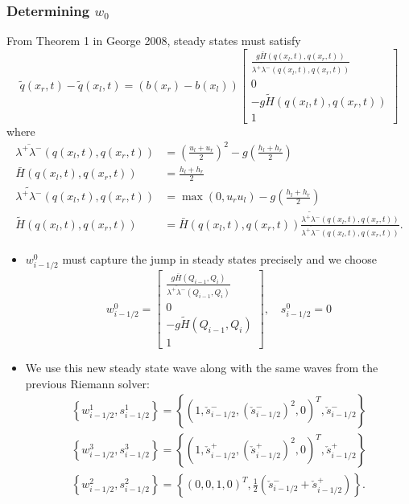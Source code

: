 \documentclass{beamer}
\begin{document}
\frame
{
\frametitle{Determining $w_0$}
From Theorem 1 in George 2008, steady states must satisfy
\begin{equation}
\tilde{q}(x_r,t)-\tilde{q}(x_l,t)=(b(x_r)-b(x_l))\begin{bmatrix}
\frac{g\bar{H}(q(x_l,t),q(x_r,t))}{\overline{\lambda^+ \lambda^-}(q(x_l,t),q(x_r,t))}\\
0\\
-g\tilde{H}(q(x_l,t),q(x_r,t))\\
1
\end{bmatrix}
\end{equation}
where
\begin{align*}
\overline{\lambda^+ \lambda^-}(q(x_l,t),q(x_r,t))&=\left(\frac{u_l+u_r}{2}\right)^2-g\left(\frac{h_l+h_r}{2}\right)  \\
\bar{H}(q(x_l,t),q(x_r,t))&=\frac{h_l+h_r}{2}\\
\widetilde{\lambda^+ \lambda^-}(q(x_l,t),q(x_r,t))&= \max (0,u_r u_l)-g\left(\frac{h_l+h_r}{2}\right)\\
\tilde{H}(q(x_l,t),q(x_r,t))&=\bar{H}(q(x_l,t),q(x_r,t)) \frac{\widetilde{\lambda^+ \lambda^-}(q(x_l,t),q(x_r,t))}{\overline{\lambda^+ \lambda^-}(q(x_l,t),q(x_r,t))}.
\end{align*}
}

\frame
{
\begin{itemize}
\item<1-> $w_{i-1/2}^0$ must capture the jump in steady states precisely and we choose
\begin{equation}
w_{i-1/2}^0=\begin{bmatrix}
\frac{g\bar{H}(Q_{i-1},Q_i)}{\overline{\lambda^+ \lambda^-}(Q_{i-1},Q_i)}\\
0\\
-g\tilde{H}(Q_{i-1},Q_i)\\
1
\end{bmatrix},\quad s_{i-1/2}^0=0
\end{equation}
\item<2-> We use this new steady state wave along with the same waves from the previous Riemann solver:
\begin{align*}
\left\{ w_{i-1/2}^1,s_{i-1/2}^1\right\}=\left\{\left(1,\check{s}_{i-1/2}^-,\left(\check{s}_{i-1/2}^-\right)^2,0\right)^T, \check{s}_{i-1/2}^- \right\} \\
\left\{ w_{i-1/2}^3,s_{i-1/2}^3\right\}=\left\{\left(1,\check{s}_{i-1/2}^+,\left(\check{s}_{i-1/2}^+\right)^2,0\right)^T, \check{s}_{i-1/2}^+ \right\}\\
\left\{ w_{i-1/2}^2,s_{i-1/2}^2      \right\}=\left\{  \left(0,0,1,0\right)^T, \frac{1}{2} \left(\check{s}_{i-1/2}^- + \check{s}_{i-1/2}^+\right)    \right\}.
\end{align*}
\end{itemize}
}
\end{document}

